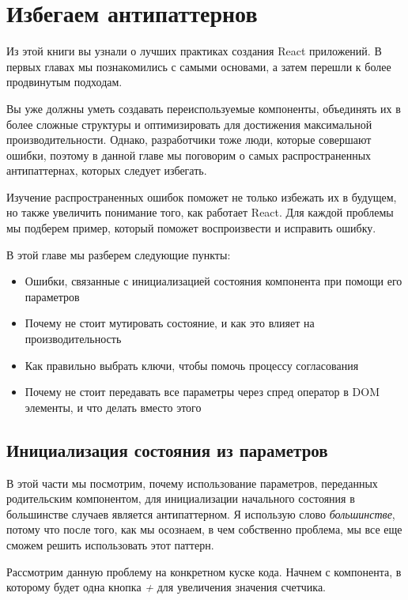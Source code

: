 \chapter{Избегаем антипаттернов}

Из этой книги вы узнали о лучших практиках создания React приложений. В первых главах мы познакомились с самыми основами, а затем перешли к более продвинутым подходам.

Вы уже должны уметь создавать переиспользуемые компоненты, объединять их в более сложные структуры и оптимизировать для достижения максимальной производительности. Однако, разработчики тоже люди, которые совершают ошибки, поэтому в данной главе мы поговорим о самых распространенных антипаттернах, которых следует избегать.

Изучение распространенных ошибок поможет не только избежать их в будущем, но также увеличить понимание того, как работает React. Для каждой проблемы мы подберем пример, который поможет воспроизвести и исправить ошибку.

В этой главе мы разберем следующие пункты:

\begin{itemize}
  \item Ошибки, связанные с инициализацией состояния компонента при помощи его параметров
  \item Почему не стоит мутировать состояние, и как это влияет на производительность
  \item Как правильно выбрать ключи, чтобы помочь процессу согласования
  \item Почему не стоит передавать все параметры через спред оператор в DOM элементы, и что делать вместо этого
\end{itemize}


\section{Инициализация состояния из параметров}

В этой части мы посмотрим, почему использование параметров, переданных родительским компонентом, для инициализации начального состояния в большинстве случаев является антипаттерном. Я использую слово \textit{большинстве}, потому что после того, как мы осознаем, в чем собственно проблема, мы все еще сможем решить использовать этот паттерн. 

Рассмотрим данную проблему на конкретном куске кода. Начнем с компонента, в которому будет одна кнопка \textit{+} для увеличения значения счетчика.

